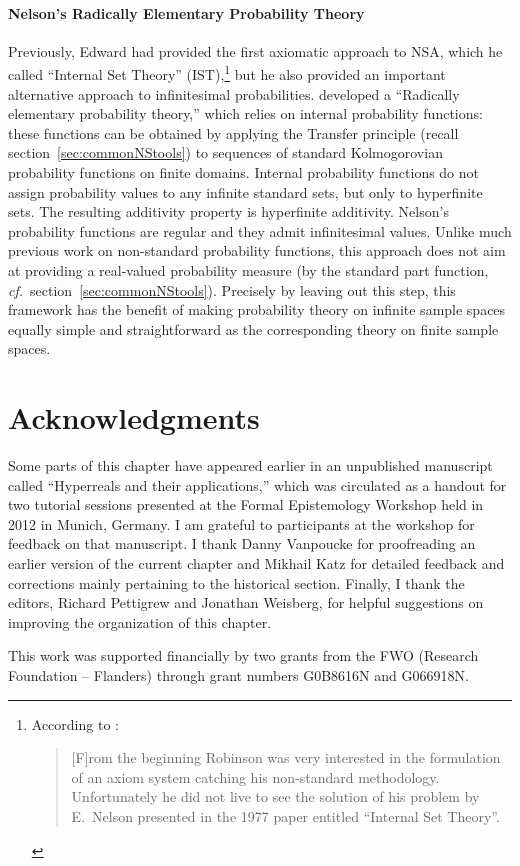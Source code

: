\paragraph{Nelson's Radically Elementary Probability Theory}
Previously, Edward \citet{Nelson:1977} had provided the first axiomatic approach to NSA, which he called ``Internal Set Theory'' (IST),\footnote{According to \citet[p.~xi]{Luxemburg:2007}:
\begin{quote}
[F]rom the beginning Robinson was very interested in the formulation of an axiom system catching his non-standard methodology. Unfortunately he did not live to see the solution of his problem by E.~Nelson presented in the 1977 paper entitled ``Internal Set Theory''.
\end{quote}}
but he also provided an important alternative approach to infinitesimal probabilities. \citet{Nelson:1987} developed a ``Radically elementary probability theory,'' which relies on internal probability functions: these functions can be obtained by applying the Transfer principle (recall section~\ref{sec:commonNStools}) to sequences of standard Kolmogorovian probability functions on finite domains. Internal probability functions do not assign probability values to any infinite standard sets, but only to hyperfinite sets. The resulting additivity property is hyperfinite additivity.
Nelson's probability functions are regular and they admit infinitesimal values. Unlike much previous work on non-standard probability functions, this approach does not aim at providing a real-valued probability measure (by the standard part function, \textit{cf.}\ section~\ref{sec:commonNStools}). Precisely by leaving out this step, this framework has the benefit of making probability theory on infinite sample spaces equally simple and straightforward as the corresponding theory on finite sample spaces.

\section*{Acknowledgments}
Some parts of this chapter have appeared earlier in an un\-pub\-lished man\-u\-script called ``Hyperreals and their applications,'' which was circulated as a handout for two tutorial sessions presented at the Formal Epistemology Workshop held in 2012 in Munich, Germany. I am grateful to participants at the workshop for feedback on that manuscript.
I thank Danny Vanpoucke for proofreading an earlier version of the current chapter and Mikhail Katz for detailed feedback and corrections mainly pertaining to the historical section. Finally, I thank the editors, Richard Pettigrew and Jonathan Weisberg, for helpful suggestions on improving the organization of this chapter.

This work was supported financially by two grants from the FWO (Research Foundation -- Flanders) through grant numbers G0B8616N and G066918N.